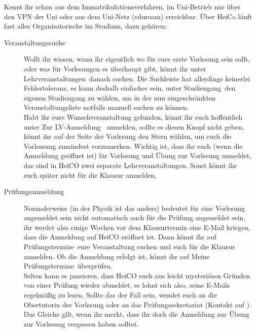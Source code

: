 \begin{description}[style=nextline]
    \item[\href{https://heico.uni-heidelberg.de/} {heiCO} \vspace*{2mm} ]
	
	Kennt ihr schon aus dem Immatrikulationsverfahren, im Uni-Betrieb nur über den VPN der Uni oder aus dem Uni-Netz (eduroam) erreichbar. Über HeiCo läuft fast alles Organisatorische im Studium, dazu gehören:
	
	\begin{description}
		\item[Veranstaltungssuche] Wollt ihr wissen, wann ihr eigentlich wo für eure erste Vorlesung sein sollt, oder was für Vorlesungen es überhaupt gibt, könnt ihr unter \grqq Lehrveranstaltungen\grqq\ danach suchen. Die Suchleiste hat allerdings keinerlei Fehlertoleranz, es kann deshalb einfacher sein, unter \grqq Studiengang\grqq\ den eigenen Studiengang zu wählen, um in der nun eingeschränkten Veranstaltungsliste notfalls manuell suchen zu können.\\
		Habt ihr eure Wunschveranstaltung gefunden, könnt ihr euch hoffentlich unter \grqq Zur LV-Anmeldung \grqq\ anmelden, sollte es diesen Knopf nicht geben, könnt ihr auf der Seite der Vorlesung den Stern wählen, um euch die Vorlessung zumindest vorzumerken. Wichtig ist, dass ihr euch (wenn die Anmeldung geöffnet ist) für Vorlesung und Übung zur Vorlesung anmeldet, das sind in HeiCO zwei separate Lehrveranstaltungen. Sonst könnt ihr euch später nicht für die Klausur anmelden.
		
		\item[Prüfungsanmeldung] Normalerweise (in der Physik ist das anders) bedeutet für eine Vorlesung angemeldet sein nicht automatisch auch für die Prüfung angemeldet sein, ihr werdet also einige Wochen vor dem Klausurtermin eine E-Mail kriegen, dass die Anmeldung auf HeiCO eröffnet ist. Dann könnt ihr auf \grqq Prüfungstermine\grqq\ eure Veranstaltung suchen und euch für die Klausur anmelden. Ob die Anmeldung erfolgt ist, könnt ihr auf \grqq Meine Prüfungstermine\grqq\ überprüfen.\\
		Selten kann es passieren, dass HeiCO euch aus leicht mysteriösen Gründen von einer Prüfung wieder abmeldet, es lohnt sich also, seine E-Mails regelmäßig zu lesen. Sollte das der Fall sein, wendet euch an die Obertutorin der Vorlesung oder an das Prüfungssekretariat (Kontakt auf ). Das Gleiche gilt, wenn ihr merkt, dass ihr doch die Anmeldung zur Übung zur Vorlesung vergessen haben solltet.
		

\end{description}
\end{description}
